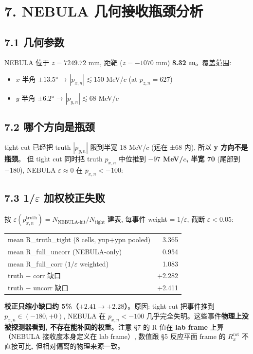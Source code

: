 \documentclass[a4paper,11pt]{article}
\begin{document}
\section{7. NEBULA 几何接收瓶颈分析}

\subsection*{7.1 几何参数}
NEBULA 位于 $z = 7249.72$ mm, 距靶 ($z = -1070$ mm) \textbf{8.32 m}。覆盖范围:
\begin{itemize}[nosep]
\item $x$ 半角 $\pm 13.5°$ → $|p_{x,n}| \lesssim 150$ MeV/$c$ (at $p_{z,n}=627$)
\item $y$ 半角 $\pm 6.2°$ → $|p_{y,n}| \lesssim 68$ MeV/$c$
\end{itemize}

\subsection*{7.2 哪个方向是瓶颈}
tight cut 已经把 truth $|p_{y,n}|$ 限到半宽 18 MeV/$c$ (远在 ±68 内), 所以 \textbf{y 方向不是瓶颈}。
但 tight cut 同时把 truth $p_{x,n}$ 中位推到 \textbf{$-97$ MeV/$c$, 半宽 70} (尾部到 $-180$), NEBULA $\varepsilon \approx 0$ 在 $p_{x,n} < -100$:
\subsection*{7.3 1/$\varepsilon$ 加权校正失败}
按 $\varepsilon(p_{x,n}^\text{truth}) = N_\text{NEBULA-hit}/N_\text{tight}$ 建表, 每事件 weight = $1/\varepsilon$, 截断 $\varepsilon < 0.05$:
\begin{table}[H]
\centering\footnotesize
\begin{tabular}{lr}
\toprule
mean R\_truth\_tight (8 cells, ynp+ypn pooled)            & 3.365 \\
mean R\_full\_uncorr (NEBULA-only)         & 0.954 \\
mean R\_full\_corr ($1/\varepsilon$ weighted)  & 1.083 \\
\midrule
truth − corr 缺口                          & +2.282 \\
truth − uncorr 缺口                        & +2.411 \\
\bottomrule
\end{tabular}
\end{table}

\textbf{校正只缩小缺口约 5\%（$+2.41 \to +2.28$）}。原因: tight cut 把事件推到 $p_{x,n} \in (-180, +0)$, NEBULA 在 $p_{x,n} < -100$ 几乎完全失明。这些事件\textbf{物理上没被探测器看到, 不存在能补回的权重}。注意 §7 的 R 值在 \textbf{lab frame} 上算（NEBULA 接收度本身定义在 lab frame）, 数值跟 §5 反应平面 frame 的 $R_x^\text{rot}$ 不直接可比, 但相对偏离的物理来源一致。
\end{document}
